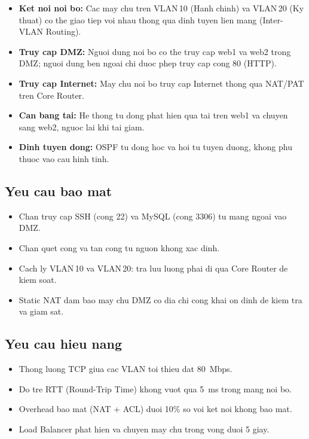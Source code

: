 \begin{itemize}
    \item \textbf{Ket noi noi bo:} Cac may chu tren VLAN\,10 (Hanh chinh) va VLAN\,20 (Ky thuat) co the giao tiep voi nhau thong qua dinh tuyen lien mang (Inter-VLAN Routing).
    \item \textbf{Truy cap DMZ:} Nguoi dung noi bo co the truy cap web1 va web2 trong DMZ; nguoi dung ben ngoai chi duoc phep truy cap cong 80 (HTTP).
    \item \textbf{Truy cap Internet:} May chu noi bo truy cap Internet thong qua NAT/PAT tren Core Router.
    \item \textbf{Can bang tai:} He thong tu dong phat hien qua tai tren web1 va chuyen sang web2, nguoc lai khi tai giam.
    \item \textbf{Dinh tuyen dong:} OSPF tu dong hoc va hoi tu tuyen duong, khong phu thuoc vao cau hinh tinh.
\end{itemize}

\subsection{Yeu cau bao mat}

\begin{itemize}
    \item Chan truy cap SSH (cong 22) va MySQL (cong 3306) tu mang ngoai vao DMZ.
    \item Chan quet cong va tan cong tu nguon khong xac dinh.
    \item Cach ly VLAN\,10 va VLAN\,20: tra luu luong phai di qua Core Router de kiem soat.
    \item Static NAT dam bao may chu DMZ co dia chi cong khai on dinh de kiem tra va giam sat.
\end{itemize}

\subsection{Yeu cau hieu nang}

\begin{itemize}
    \item Thong luong TCP giua cac VLAN toi thieu dat 80~Mbps.
    \item Do tre RTT (Round-Trip Time) khong vuot qua 5~ms trong mang noi bo.
    \item Overhead bao mat (NAT + ACL) duoi 10\% so voi ket noi khong bao mat.
    \item Load Balancer phat hien va chuyen may chu trong vong duoi 5 giay.
\end{itemize}

